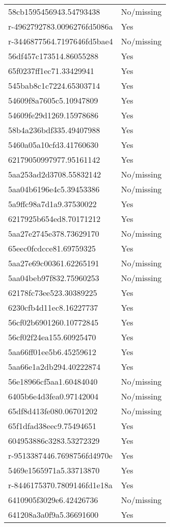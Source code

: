 \begin{tabular}{ll}
58cb1595456943.54793438 & No/missing \\
r-4962792783.0096276fd5086a & Yes \\
r-3446877564.7197646fd5bae4 & No/missing \\
56df457c173514.86055288 & Yes \\
65f0237ff1ec71.33429941 & Yes \\
545bab8c1c7224.65303714 & Yes \\
54609f8a7605c5.10947809 & Yes \\
54609fe29d1269.15978686 & Yes \\
58b4a236bdf335.49407988 & Yes \\
5460a05a10cfd3.41760630 & Yes \\
62179050997977.95161142 & Yes \\
5aa253ad2d3708.55832142 & No/missing \\
5aa04b6196e4c5.39453386 & No/missing \\
5a9ffc98a7d1a9.37530022 & Yes \\
6217925b654ed8.70171212 & Yes \\
5aa27e2745e378.73629170 & No/missing \\
65eec0fcdcce81.69759325 & Yes \\
5aa27e69c00361.62265191 & No/missing \\
5aa04beb97f832.75960253 & No/missing \\
62178fc73ee523.30389225 & Yes \\
6230cfb4d11ec8.16227737 & Yes \\
56cf02b6901260.10772845 & Yes \\
56cf02f24ea155.60925470 & Yes \\
5aa66ff01ee5b6.45259612 & Yes \\
5aa66e1a2db294.40222874 & Yes \\
56e18966cf5aa1.60484040 & No/missing \\
6405b6e4d3fea0.97142004 & No/missing \\
65df8d413fe080.06701202 & No/missing \\
65f1dfad38eec9.75494651 & Yes \\
604953886c3283.53272329 & Yes \\
r-9513387446.7698756fd4970e & Yes \\
5469e1565971a5.33713870 & Yes \\
r-8446175370.7809146fd1e18a & Yes \\
6410905f3029e6.42426736 & No/missing \\
641208a3a0f9a5.36691600 & Yes \\

\end{tabular}
